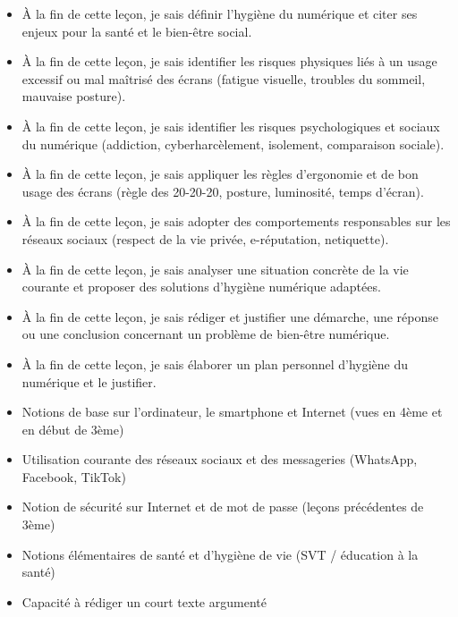 \documentclass[11pt]{article}
\begin{document}
\begin{objectifs}
\begin{itemize}
\item À la fin de cette leçon, je sais définir l'hygiène du numérique et citer ses enjeux pour la santé et le bien-être social.
\item À la fin de cette leçon, je sais identifier les risques physiques liés à un usage excessif ou mal maîtrisé des écrans (fatigue visuelle, troubles du sommeil, mauvaise posture).
\item À la fin de cette leçon, je sais identifier les risques psychologiques et sociaux du numérique (addiction, cyberharcèlement, isolement, comparaison sociale).
\item À la fin de cette leçon, je sais appliquer les règles d'ergonomie et de bon usage des écrans (règle des 20-20-20, posture, luminosité, temps d'écran).
\item À la fin de cette leçon, je sais adopter des comportements responsables sur les réseaux sociaux (respect de la vie privée, e-réputation, netiquette).
\item À la fin de cette leçon, je sais analyser une situation concrète de la vie courante et proposer des solutions d'hygiène numérique adaptées.
\item À la fin de cette leçon, je sais rédiger et justifier une démarche, une réponse ou une conclusion concernant un problème de bien-être numérique.
\item À la fin de cette leçon, je sais élaborer un plan personnel d'hygiène du numérique et le justifier.
\end{itemize}
\end{objectifs}

\begin{prerequis}
\begin{itemize}
\item Notions de base sur l'ordinateur, le smartphone et Internet (vues en 4ème et en début de 3ème)
\item Utilisation courante des réseaux sociaux et des messageries (WhatsApp, Facebook, TikTok)
\item Notion de sécurité sur Internet et de mot de passe (leçons précédentes de 3ème)
\item Notions élémentaires de santé et d'hygiène de vie (SVT / éducation à la santé)
\item Capacité à rédiger un court texte argumenté
\end{itemize}
\end{prerequis}
\end{document}
